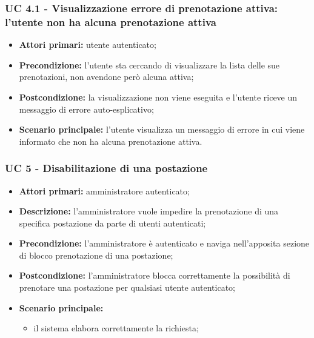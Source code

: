 \subsubsection{UC 4.1 - Visualizzazione errore di prenotazione attiva: l'utente non ha alcuna prenotazione attiva}
\begin{itemize}
\item \textbf{Attori primari:} utente autenticato;
\item \textbf{Precondizione:} l'utente sta cercando di visualizzare la lista delle sue prenotazioni, non avendone però alcuna attiva;
\item \textbf{Postcondizione:} la visualizzazione non viene eseguita e l'utente riceve un messaggio di errore auto-esplicativo;
\item \textbf{Scenario principale:} l'utente visualizza un messaggio di errore in cui viene informato che non ha alcuna prenotazione attiva.
\end{itemize}

\subsubsection{UC 5 - Disabilitazione di una postazione}

\begin{itemize}
\item \textbf{Attori primari:} amministratore autenticato;
\item \textbf{Descrizione:} l’amministratore vuole impedire la prenotazione di una specifica postazione da parte di utenti autenticati;
\item \textbf{Precondizione:} l’amministratore è autenticato e naviga nell’apposita sezione di blocco prenotazione di una postazione;
\item \textbf{Postcondizione:} l’amministratore blocca correttamente la possibilità di prenotare una postazione per qualsiasi utente autenticato;
\item \textbf{Scenario principale:} 
	\begin{itemize}
		\item il sistema elabora correttamente la richiesta;
		\end{itemize}
\end{itemize}
